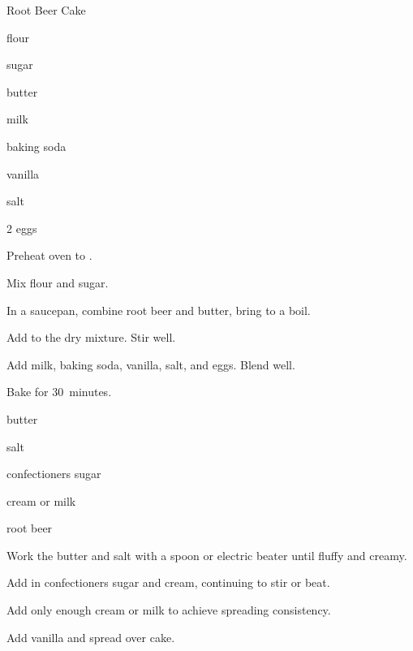 \begin{recipe}{Root Beer Cake}{}{}

\begin{ingredients}
\item {} flour
\item {} sugar
\item {} 
\item {} butter
\item \C{\half} milk
\item {} baking soda
\item {} vanilla
\item \tp{\half} salt
\item 2 eggs
\end{ingredients}

\begin{directions}
\item Preheat oven to .
\item Mix flour and sugar.
\item In a saucepan, combine root beer and butter, bring to a boil.
\item Add to the dry mixture.  Stir well.
\item Add milk, baking soda, vanilla, salt, and eggs. Blend well.
\item Bake for 30~minutes. 
\end{directions}


\begin{ingredients}
\item \C{\quarter} butter
\item \tp{\eighth} salt
\item {} confectioners sugar
\item {} cream or milk
\item {} root beer
\end{ingredients}

\begin{directions}
\item Work the butter and salt with a spoon or electric beater until fluffy and creamy.
\item Add in confectioners sugar and cream, continuing to stir or beat.
\item Add only enough cream or milk to achieve spreading consistency.
\item Add vanilla and spread over cake.
\end{directions}
\end{recipe}
